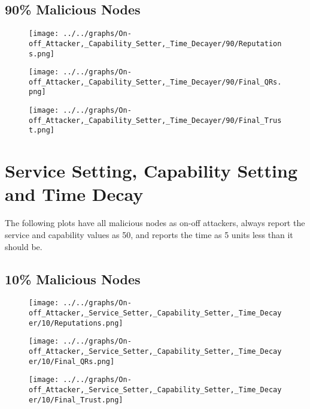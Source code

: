 \begin{minipage}[t]{0.49\columnwidth}
\subsection*{90\% Malicious Nodes}
    \begin{figure}[H]
        \centering
        \texttt{[image: ../../graphs/On-off\_Attacker,\_Capability\_Setter,\_Time\_Decayer/90/Reputations.png]}
    \end{figure}
    \begin{figure}[H]
        \centering
        \texttt{[image: ../../graphs/On-off\_Attacker,\_Capability\_Setter,\_Time\_Decayer/90/Final\_QRs.png]}
    \end{figure}
\end{minipage}
\begin{minipage}[t]{0.49\columnwidth}
    \begin{figure}[H]
        \centering
        \texttt{[image: ../../graphs/On-off\_Attacker,\_Capability\_Setter,\_Time\_Decayer/90/Final\_Trust.png]}
    \end{figure}
\end{minipage}
\newpage

\section*{Service Setting, Capability Setting and Time Decay}
The following plots have all malicious nodes as on-off attackers, always
report the service and capability values as 50, and reports the time as
5 units less than it should be.
\\
\begin{minipage}[t]{0.49\columnwidth}
\subsection*{10\% Malicious Nodes}
    \begin{figure}[H]
        \centering
        \texttt{[image: ../../graphs/On-off\_Attacker,\_Service\_Setter,\_Capability\_Setter,\_Time\_Decayer/10/Reputations.png]}
    \end{figure}
    \begin{figure}[H]
        \centering
        \texttt{[image: ../../graphs/On-off\_Attacker,\_Service\_Setter,\_Capability\_Setter,\_Time\_Decayer/10/Final\_QRs.png]}
    \end{figure}
\end{minipage}
\begin{minipage}[t]{0.49\columnwidth}
    \begin{figure}[H]
        \centering
        \texttt{[image: ../../graphs/On-off\_Attacker,\_Service\_Setter,\_Capability\_Setter,\_Time\_Decayer/10/Final\_Trust.png]}
    \end{figure}
\end{minipage}

